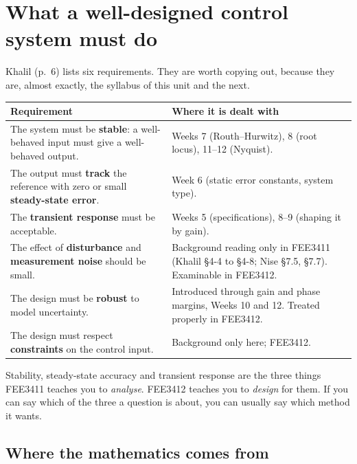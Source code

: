 \documentclass[11pt,a4paper]{article}
\begin{document}
\section{What a well-designed control system must do}
\label{sec:objectives}

Khalil (p.~6) lists six requirements. They are worth copying out, because they
are, almost exactly, the syllabus of this unit and the next.

\begin{center}
\begin{tabular}{@{}p{}p{}@{}}
\toprule
\textbf{Requirement} & \textbf{Where it is dealt with}\\
\midrule
The system must be \textbf{stable}: a well-behaved input must give a
well-behaved output. & Weeks 7 (Routh--Hurwitz), 8 (root locus),
11--12 (Nyquist). \\
The output must \textbf{track} the reference with zero or small
\textbf{steady-state error}. & Week 6 (static error constants, system type).\\
The \textbf{transient response} must be acceptable. & Weeks 5 (specifications),
8--9 (shaping it by gain).\\
The effect of \textbf{disturbance} and \textbf{measurement noise} should be
small. & Background reading only in FEE3411 (Khalil \S4-4 to \S4-8; Nise
\S7.5, \S7.7). Examinable in FEE3412.\\
The design must be \textbf{robust} to model uncertainty. & Introduced through
gain and phase margins, Weeks 10 and 12. Treated properly in FEE3412.\\
The design must respect \textbf{constraints} on the control input. &
Background only here; FEE3412.\\
\bottomrule
\end{tabular}
\end{center}

\begin{keyidea}
Stability, steady-state accuracy and transient response are the three things
FEE3411 teaches you to \emph{analyse}. FEE3412 teaches you to \emph{design} for
them. If you can say which of the three a question is about, you can usually
say which method it wants.
\end{keyidea}

\subsection{Where the mathematics comes from}
\end{document}
